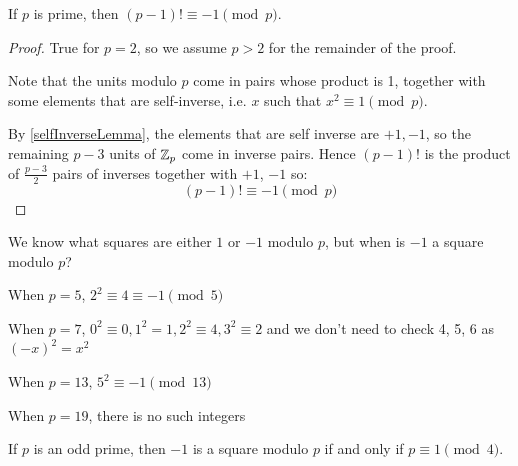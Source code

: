 \documentclass[../main.tex]{subfiles}
\begin{document}
\begin{theorem}
  If $p$ is prime, then $(p - 1)! \equiv -1 \pmod{p}$.
\end{theorem}
\begin{proof}
  True for $p = 2$, so we assume $p > 2$ for the remainder of the proof.

  Note that the units modulo $p$ come in pairs whose product is 1, together with some elements that are self-inverse, i.e. $x$ such that $x^2 \equiv 1 \pmod{p}$.

  By \cref{selfInverseLemma}, the elements that are self inverse are $+1, -1$, so the remaining $p - 3$ units of $\mathbb{Z}_p$ come in inverse pairs.
  Hence $(p - 1)!$ is the product of $\frac{p - 3}{2}$ pairs of inverses together with $+1$, $-1$ so:
  \[
    (p - 1)! \equiv -1 \pmod{p}
  \]
\end{proof}
We know what squares are either $1$ or $-1$ modulo $p$, but when is $-1$ a square modulo $p$?
\begin{example}
  When $p = 5$, $2^{2} \equiv 4 \equiv -1 \pmod{5}$ \tick

  When $p = 7$, $0^{2} \equiv 0, 1^{2} = 1, 2^{2} \equiv 4, 3^{2} \equiv 2$ and we don't need to check 4, 5, 6 as $(-x)^2 = x^2$ \cross

  When $p=13$, $5^{2} \equiv - 1 \pmod{13}$ \tick

  When $p = 19$, there is no such integers \cross
\end{example}
\begin{proposition}
  If $p$ is an odd prime, then $-1$ is a square modulo $p$ if and only if $p \equiv 1 \pmod{4}$.
\end{proposition}
\end{document}
